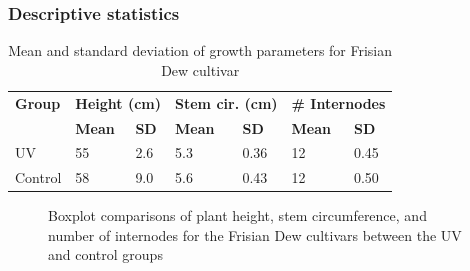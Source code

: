 \documentclass[12pt, aspectratio=1610]{beamer}
\begin{document}
    \begin{frame}
        \frametitle{Descriptive statistics}
        \footnotesize
        \begin{table}
            \caption{Mean and standard deviation of growth parameters for Frisian Dew cultivar}
            \begin{tabular}{l|ll|ll|ll}
                \hline
                \hline
                \textbf{Group} & \multicolumn{2}{l|}{\textbf{Height (\unit[mode=text]{\cm})}} & \multicolumn{2}{l|}{\textbf{Stem cir. (\unit[mode=text]{\cm})}} & \multicolumn{2}{l}{\textbf{\# Internodes}} \\
                & \textbf{Mean} & \textbf{SD} & \textbf{Mean} & \textbf{SD} & \textbf{Mean} & \textbf{SD} \\
                \hline
                \hline
                UV & \num[mode=text]{55} & \num[mode=text]{2.6} & \num[mode=text]{5.3} & \num[mode=text]{0.36} & \num[mode=text]{12} & \num[mode=text]{0.45} \\
                Control & \num[mode=text]{58} & \num[mode=text]{9.0} & \num[mode=text]{5.6} & \num[mode=text]{0.43} & \num[mode=text]{12} & \num[mode=text]{0.50} \\
                \hline
                \hline
            \end{tabular}
        \end{table}
        \begin{figure}
            \begin{subfigure}[t]{.32\textwidth}
                
            \end{subfigure}
            \begin{subfigure}[t]{.32\textwidth}
                
            \end{subfigure}
            \begin{subfigure}[t]{.32\textwidth}
                
            \end{subfigure}
            \caption{Boxplot comparisons of plant height, stem circumference, and number of internodes for the Frisian Dew cultivars between the UV and control groups}
        \end{figure}
    \end{frame}
\end{document}
